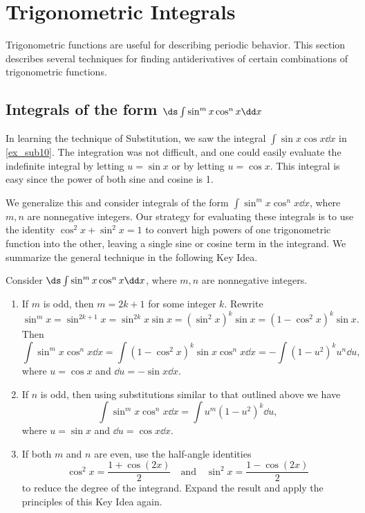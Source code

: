 

\section{Trigonometric Integrals}\label{sec:trigint}

Trigonometric functions are useful for describing periodic behavior. This section describes several techniques for finding antiderivatives of certain combinations of trigonometric functions.

\subsection{Integrals of the form \texorpdfstring{$\ds \int \sin^m x\cos^n x\dd x$}{∫(sin x)\^{}m (cos x)\^{}n dx}}

In learning the technique of Substitution, we saw the integral $\int \sin x\cos x\dd x$ in \autoref{ex_sub10}. The integration was not difficult, and one could easily evaluate the indefinite integral by letting $u=\sin x$ or by letting $u = \cos x$. This integral is easy since the power of both sine and cosine is 1.

We generalize this and consider integrals of the form $\int \sin^mx\cos^nx\dd x$, where $m,n$ are nonnegative integers. Our strategy for evaluating these integrals is to use the identity $\cos^2x+\sin^2x=1$ to convert high powers of one trigonometric function into the other, leaving a single sine or cosine term in the integrand. We summarize the general technique in the following Key Idea.



{%
\begin{keyidea}\label{idea:trig_int_1}%
Consider $\ds \int \sin^mx\cos^nx\dd x$, where $m,n$ are nonnegative integers.
\begin{enumerate}
	\item	If $m$ is odd, then $m=2k+1$ for some integer $k$. Rewrite \small
		\[
		\sin^mx = \sin^{2k+1}x = \sin^{2k}x\sin x = (\sin^2x)^k\sin x = (1-\cos^2x)^k\sin x.
		\]
		\normalsize Then \small
		\[
		\int \sin^mx\cos^nx\dd x = \int (1-\cos^2x)^k\sin x\cos^nx\dd x = -\int (1-u^2)^ku^n\dd u,
		\]
		\normalsize where $u = \cos x$ and $\dd u = -\sin x\dd x$. 
	\item	If $n$ is odd, then using substitutions similar to that outlined above we have \small
		\[\int \sin^mx\cos^nx\dd x = \int u^m(1-u^2)^k\dd u,\]
		\normalsize where $u = \sin x$ and $\dd u = \cos x\dd x$.
	\item	If both $m$ and $n$ are even, use the half-angle identities \small
		\[
		\cos^2x = \frac{1+\cos (2x)}{2} \quad \text{and}\quad \sin^2x = \frac{1-\cos(2x)}2
		\]
		\normalsize to reduce the degree of the integrand. Expand the result and apply the principles of this Key Idea again.
	\end{enumerate}
\end{keyidea}%
}


